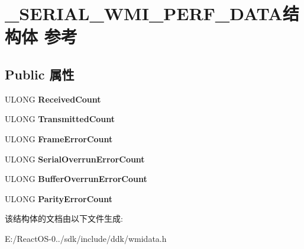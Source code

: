 \hypertarget{struct___s_e_r_i_a_l___w_m_i___p_e_r_f___d_a_t_a}{}\section{\+\_\+\+S\+E\+R\+I\+A\+L\+\_\+\+W\+M\+I\+\_\+\+P\+E\+R\+F\+\_\+\+D\+A\+T\+A结构体 参考}
\label{struct___s_e_r_i_a_l___w_m_i___p_e_r_f___d_a_t_a}
\subsection*{Public 属性}
\begin{DoxyCompactItemize}
\item 
\mbox{\label{struct___s_e_r_i_a_l___w_m_i___p_e_r_f___d_a_t_a_a1b389a8c81a1dfaa5cf2270a5e0fc965}} 
U\+L\+O\+NG {\bfseries Received\+Count}
\item 
\mbox{\label{struct___s_e_r_i_a_l___w_m_i___p_e_r_f___d_a_t_a_ad267fb530a8358d09f4853991c318233}} 
U\+L\+O\+NG {\bfseries Transmitted\+Count}
\item 
\mbox{\label{struct___s_e_r_i_a_l___w_m_i___p_e_r_f___d_a_t_a_a0982021e0bab8da11b56de15975fdcb7}} 
U\+L\+O\+NG {\bfseries Frame\+Error\+Count}
\item 
\mbox{\label{struct___s_e_r_i_a_l___w_m_i___p_e_r_f___d_a_t_a_adccf43a4271c12a78102b1e1782d17c5}} 
U\+L\+O\+NG {\bfseries Serial\+Overrun\+Error\+Count}
\item 
\mbox{\label{struct___s_e_r_i_a_l___w_m_i___p_e_r_f___d_a_t_a_a1f676f85c995bca908fc20c21910c043}} 
U\+L\+O\+NG {\bfseries Buffer\+Overrun\+Error\+Count}
\item 
\mbox{\label{struct___s_e_r_i_a_l___w_m_i___p_e_r_f___d_a_t_a_a2b06373a2e188741cde42bc387012925}} 
U\+L\+O\+NG {\bfseries Parity\+Error\+Count}
\end{DoxyCompactItemize}


该结构体的文档由以下文件生成\+:\begin{DoxyCompactItemize}
\item 
E\+:/\+React\+O\+S-\/0../sdk/include/ddk/wmidata.\+h\end{DoxyCompactItemize}
